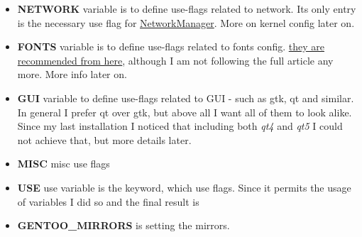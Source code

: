 \documentclass[11pt,a4paper]{article}
\begin{document}
\begin{itemize}
                        

                    \item \textbf{NETWORK} variable is to define use-flags related to network. Its only entry is the necessary use flag for \href{https://wiki.gentoo.org/wiki/NetworkManager#Installation}{NetworkManager}. More on kernel config later on.

                        

                    \item \textbf{FONTS} variable is to define use-flags related to fonts config. \href{http://kev009.com/wp/2009/12/getting-beautiful-fonts-in-gentoo-linux/}{they are recommended from here}, although I am not following the full article any more. More info later on.

                        

                    \item \textbf{GUI} variable to define use-flags related to GUI - such as gtk, qt and similar. In general I prefer qt over gtk, but above all I want all of them to look alike. Since my last installation I noticed that including both \textit{qt4} and \textit{qt5} I could not achieve that, but more details later.

                        

                    \item \textbf{MISC} misc use flags

                        

                    \item \textbf{USE} use variable is the keyword, which use flags. Since it permits the usage of variables I did so and the final result is

                        

                    \item \textbf{GENTOO\_MIRRORS} is setting the mirrors.


\end{itemize}
\end{document}
